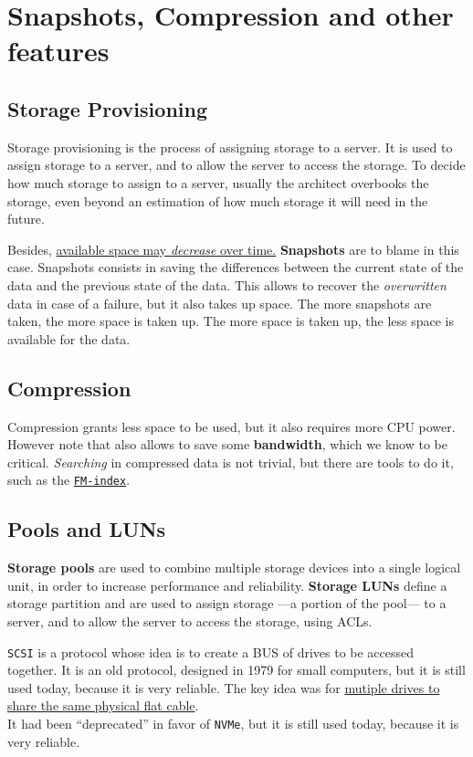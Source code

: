 \section{Snapshots, Compression and other features}
\subsection{Storage Provisioning}
Storage provisioning is the process of assigning storage to a server. It is used to assign storage to a server, and to allow the server to access the storage.
To decide how much storage to assign to a server, usually the architect overbooks the storage, even beyond an estimation of how much storage it will need in the future.

Besides, \ul{available space may \textit{decrease} over time.}
\textbf{Snapshots} are to blame in this case. Snapshots consists in saving the differences between the current state of the data and the previous state of the data. This allows to recover the \textit{overwritten} data in case of a failure, but it also takes up space. The more snapshots are taken, the more space is taken up. The more space is taken up, the less space is available for the data.

\subsection{Compression}
Compression grants less space to be used, but it also requires more CPU power. However note that also allows to save some \textbf{bandwidth}, which we know to be critical.
\textit{Searching} in compressed data is not trivial, but there are tools to do it, such as the \href{https://en.wikipedia.org/wiki/FM-index}{\texttt{FM-index}}.

\subsection{Pools and LUNs}

\textbf{Storage pools} 
are used to combine multiple storage devices into a single logical unit, in order to increase performance and reliability. 
\textbf{Storage LUNs} define a storage partition and are used to assign storage ---a portion of the pool--- to a server, and to allow the server to access the storage, using ACLs.

\texttt{SCSI} is a protocol whose idea is to create a BUS of drives to be accessed together. It is an old protocol, designed in 1979 for small computers, but it is still used today, because it is very reliable.
The key idea was for \ul{mutiple drives to share the same physical flat cable}.\\
It had been ``deprecated'' in favor of \texttt{NVMe}, but it is still used today, because it is very reliable.



